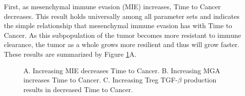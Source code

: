 \documentclass{article}
\begin{document}
First, as mesenchymal immune evasion (MIE) increases, Time to Cancer decreases.
This result holds universally among all parameter sets and indicates the simple relationship that mesenchymal immune evasion has with Time to Cancer.
As this subpopulation of the tumor becomes more resistant to immune clearance, the tumor as a whole grows more resilient and thus will grow faster.
These results are summarized by Figure \ref{fig:FirstSurvivalCurves}A.

\begin{figure}[H]
\center
{}
\caption{
A. Increasing MIE decreases Time to Cancer. 
B. Increasing MGA increases Time to Cancer.
C. Increasing Treg TGF-$\beta$ production results in decreased Time to Cancer.
}
\label{fig:FirstSurvivalCurves}
\end{figure}
\end{document}
